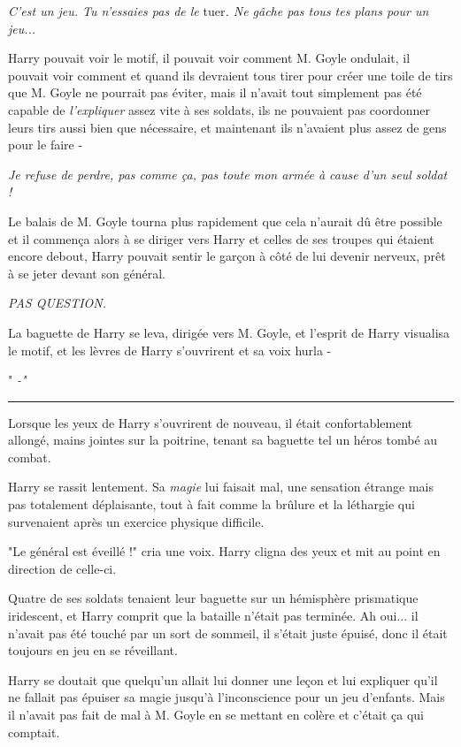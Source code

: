 \emph{C'est un jeu. Tu n'essaies pas de le } tuer\emph{. Ne gâche pas tous tes plans pour un jeu...} 

Harry pouvait voir le motif, il pouvait voir comment M. Goyle ondulait, il pouvait voir comment et quand ils devraient tous tirer pour créer une toile de tirs que M. Goyle ne pourrait pas éviter, mais il n'avait tout simplement pas été capable de \emph{l'expliquer}  assez vite à ses soldats, ils ne pouvaient pas coordonner leurs tirs aussi bien que nécessaire, et maintenant ils n'avaient plus assez de gens pour le faire -

\emph{Je refuse de perdre, pas comme ça, pas toute mon armée à cause d'un seul soldat !} 

Le balais de M. Goyle tourna plus rapidement que cela n'aurait dû être possible et il commença alors à se diriger vers Harry et celles de ses troupes qui étaient encore debout, Harry pouvait sentir le garçon à côté de lui devenir nerveux, prêt à se jeter devant son général.

\emph{PAS QUESTION.} 

La baguette de Harry se leva, dirigée vers M. Goyle, et l'esprit de Harry visualisa le motif, et les lèvres de Harry s'ouvrirent et sa voix hurla -

"\emph{} \emph{-"} 
\par\noindent\rule{\textwidth}{0.4pt}
Lorsque les yeux de Harry s'ouvrirent de nouveau, il était confortablement allongé, mains jointes sur la poitrine, tenant sa baguette tel un héros tombé au combat.

Harry se rassit lentement. Sa \emph{magie}  lui faisait mal, une sensation étrange mais pas totalement déplaisante, tout à fait comme la brûlure et la léthargie qui survenaient après un exercice physique difficile.

"Le général est éveillé !" cria une voix. Harry cligna des yeux et mit au point en direction de celle-ci.

Quatre de ses soldats tenaient leur baguette sur un hémisphère prismatique iridescent, et Harry comprit que la bataille n'était pas terminée. Ah oui... il n'avait pas été touché par un sort de sommeil, il s'était juste épuisé, donc il était toujours en jeu en se réveillant.

Harry se doutait que quelqu'un allait lui donner une leçon et lui expliquer qu'il ne fallait pas épuiser sa magie jusqu'à l'inconscience pour un jeu d'enfants. Mais il n'avait pas fait de mal à M. Goyle en se mettant en colère et c'était ça qui comptait.

